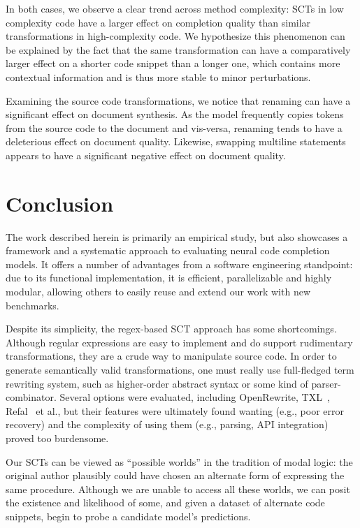 \documentclass{article} %
\begin{document}
In both cases, we observe a clear trend across method complexity: SCTs in low complexity code have a larger effect on completion quality than similar transformations in high-complexity code. We hypothesize this phenomenon can be explained by the fact that the same transformation can have a comparatively larger effect on a shorter code snippet than a longer one, which contains more contextual information and is thus more stable to minor perturbations.

Examining the source code transformations, we notice that renaming can have a significant effect on document synthesis. As the model frequently copies tokens from the source code to the document and vis-versa, renaming tends to have a deleterious effect on document quality. Likewise, swapping multiline statements appears to have a significant negative effect on document quality.

\section{Conclusion}\label{sec:conclusion}

The work described herein is primarily an empirical study, but also showcases a framework and a systematic approach to evaluating neural code completion models. It offers a number of advantages from a software engineering standpoint: due to its functional implementation, it is efficient, parallelizable and highly modular, allowing others to easily reuse and extend our work with new benchmarks.

Despite its simplicity, the regex-based SCT approach has some shortcomings. Although regular expressions are easy to implement and do support rudimentary transformations, they are a crude way to manipulate source code. In order to generate semantically valid transformations, one must really use full-fledged term rewriting system, such as higher-order abstract syntax or some kind of parser-combinator. Several options were evaluated, including OpenRewrite, TXL~\citep{cordy2004txl}, Refal~\citep{gurin1991refal} et al., but their features were ultimately found wanting (e.g., poor error recovery) and the complexity of using them (e.g., parsing, API integration) proved too burdensome.

Our SCTs can be viewed as ``possible worlds'' in the tradition of modal logic: the original author plausibly could have chosen an alternate form of expressing the same procedure. Although we are unable to access all these worlds, we can posit the existence and likelihood of some, and given a dataset of alternate code snippets, begin to probe a candidate model's predictions.
\end{document}

